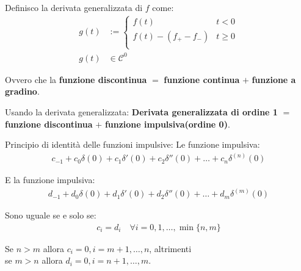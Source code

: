 Definisco la derivata generalizzata di $f$ come:
\begin{align}
	g(t) & := \begin{cases}
		          f(t)               & t < 0    \\
		          f(t) - (f_+ - f_-) & t \geq 0 \\
	          \end{cases} \\
	g(t) & \in \mathcal{C}^0
\end{align}


Ovvero che la \textbf{funzione discontinua} $=$ \textbf{funzione continua} $+$ \textbf{funzione a gradino}.

Usando la derivata generalizzata:
\textbf{Derivata generalizzata di ordine 1} $=$ \textbf{funzione discontinua} $+$ \textbf{funzione impulsiva(ordine 0)}.



Principio di identità delle funzioni impulsive:
Le funzione impulsiva:
\begin{align}
  c_{-1} + c_0\delta(0) + c_1\delta'(0) + c_2\delta''(0) + \dots + c_n\delta^{(n)}(0)
\end{align}

E la funzione impulsiva:
\begin{align}
  d_{-1} + d_0\delta(0) + d_1\delta'(0) + d_2\delta''(0) + \dots + d_m\delta^{(m)}(0)
\end{align}

Sono uguale se e solo se:
\begin{align}
  c_i = d_i \quad \forall i = 0, 1, \dots, \min \{ n, m \}
\end{align}

Se $n > m$ allora $c_i = 0, i = m + 1, \dots, n$, altrimenti \\
se $m > n$ allora $d_i = 0, i = n + 1, \dots, m$.
